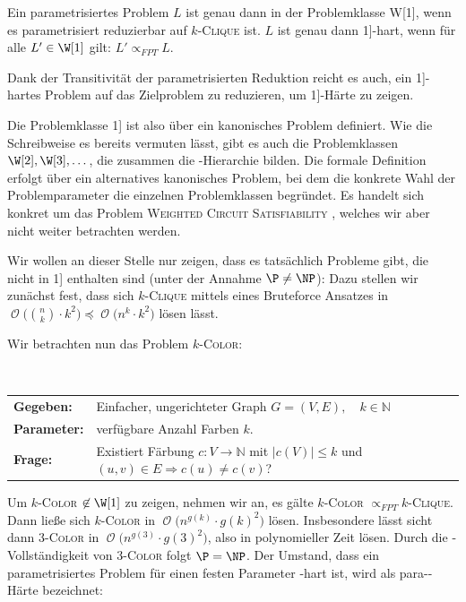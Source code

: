 \documentclass[a4paper,ngerman]{atseminar}
\newcommand{\N}{\ensuremath{\mathbb{N}}\xspace}
\newcommand{\BigO}[1]{\ensuremath{\operatorname{\mathcal{O}}\bigl(#1\bigr)}\xspace}
\begin{document}
\begin{definition}
  Ein parametrisiertes Problem $L$ ist genau dann in der Problemklasse W{[}1{]}, wenn es parametrisiert reduzierbar auf $k$-\textsc{Clique} ist.
  $L$ ist genau dann \W{[}1{]}-hart, wenn für alle $L' \in \W[1]$ gilt: $L' \propto_{FPT} L$.
\end{definition}
\noindent
Dank der Transitivität der parametrisierten Reduktion reicht es auch, ein \W{[}1{]}-hartes Problem auf das Zielproblem zu reduzieren, um
\W{[}1{]}-Härte zu zeigen.

\noindent
Die Problemklasse \W{[}1{]} ist also über ein kanonisches Problem definiert. Wie die Schreibweise es bereits vermuten lässt,
gibt es auch die Problemklassen $\W[2],\xspace\W[3], \dots$, die zusammen die \W-Hierarchie \cite{DowneyFellows} bilden. Die formale Definition erfolgt über
ein alternatives kanonisches Problem, bei dem die konkrete Wahl der Problemparameter die einzelnen Problemklassen begründet.
Es handelt sich konkret um das Problem \textsc{Weighted Circuit Satisfiability} \cite{DowneyFellows}, welches wir aber nicht weiter betrachten werden.%

\noindent
Wir wollen an dieser Stelle nur zeigen, dass es tatsächlich Probleme gibt, die nicht in \W{[}1{]}  enthalten sind (unter der Annahme $\P \neq \NP$):
Dazu stellen wir zunächst fest, dass sich $k$-\textsc{Clique} mittels eines Bruteforce Ansatzes in $\BigO{\binom{n}{k} \cdot k^2} \preceq \BigO{n^k \cdot k^2}$ lösen lässt.

\noindent
Wir betrachten nun das Problem $k$-\textsc{Color}:

\begin{definition}
  $ $\newline
  \begin{tabular}{ll}
    \textbf{Gegeben:} & Einfacher, ungerichteter Graph  $G = (V, E), \quad k \in \N$ \\
    \textbf{Parameter:} & verfügbare Anzahl Farben $k$. \\
    \textbf{Frage:} & Existiert Färbung $c: V \rightarrow \N$ mit $|c(V)| \leq k$ und $(u, v) \in E \Rightarrow c(u) \neq c(v)$?
  \end{tabular}
\end{definition}

\noindent
Um $k$-\textsc{Color} $\not\in \W[1]$ zu zeigen, nehmen wir an, es gälte $k$-\textsc{Color} $\propto_{FPT} k$-\textsc{Clique}.
Dann ließe sich $k$-\textsc{Color} in $\BigO{n^{g(k)}\cdot g(k)^2}$ lösen. Insbesondere lässt sicht dann 3-\textsc{Color} in $\BigO{n^{g(3)} \cdot g(3)^2}$, also in polynomieller Zeit lösen.
Durch die \NP-Vollständigkeit von 3-\textsc{Color} folgt $\P = \NP$.
Der Umstand, dass ein parametrisiertes Problem für einen festen Parameter \NP-hart ist, wird als para-\NP-Härte bezeichnet:
\end{document}
